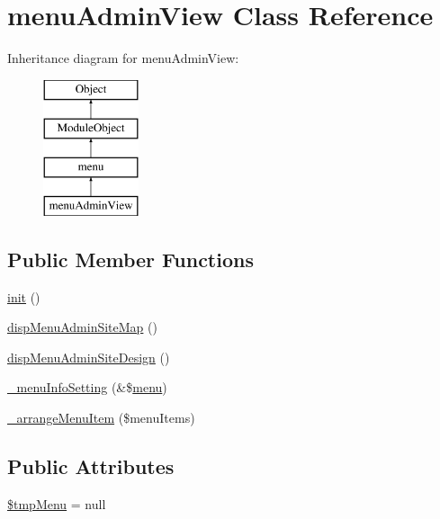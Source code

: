 \hypertarget{classmenuAdminView}{\section{menu\+Admin\+View Class Reference}
\label{classmenuAdminView}
}
Inheritance diagram for menu\+Admin\+View\+:\begin{figure}[H]
\begin{center}
\leavevmode
\includegraphics[height=4.000000cm]{classmenuAdminView}
\end{center}
\end{figure}
\subsection*{Public Member Functions}
\begin{DoxyCompactItemize}
\item 
\hyperlink{classmenuAdminView_ae7bc53b51dbc5c57f396420ec4180db0}{init} ()
\item 
\hyperlink{classmenuAdminView_afa55cc43041d721b52b8504c3b34e625}{disp\+Menu\+Admin\+Site\+Map} ()
\item 
\hyperlink{classmenuAdminView_a29d653c99c2e86ed5b8324042ef447ba}{disp\+Menu\+Admin\+Site\+Design} ()
\item 
\hyperlink{classmenuAdminView_abbcdc54eb95b1c114d43c347fd1f1008}{\+\_\+menu\+Info\+Setting} (\&\$\hyperlink{classmenu}{menu})
\item 
\hyperlink{classmenuAdminView_a9ae9e6a8ade5abcef97bd946d4ca99f7}{\+\_\+arrange\+Menu\+Item} (\$menu\+Items)
\end{DoxyCompactItemize}
\subsection*{Public Attributes}
\begin{DoxyCompactItemize}
\item 
\hyperlink{classmenuAdminView_a50d98e62711bbf3f6326b4aab2bcb12a}{\$tmp\+Menu} = null
\end{DoxyCompactItemize}


